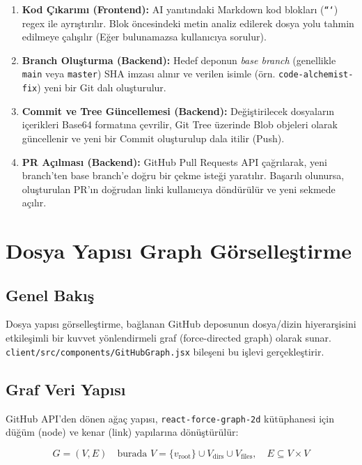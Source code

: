 \documentclass[12pt,a4paper]{article}
\begin{document}
\begin{enumerate}
    \item \textbf{Kod Çıkarımı (Frontend):} AI yanıtındaki Markdown kod blokları (\texttt{```}) regex ile ayrıştırılır. Blok öncesindeki metin analiz edilerek dosya yolu tahmin edilmeye çalışılır (Eğer bulunamazsa kullanıcıya sorulur).
    \item \textbf{Branch Oluşturma (Backend):} Hedef deponun \textit{base branch} (genellikle \texttt{main} veya \texttt{master}) SHA imzası alınır ve verilen isimle (örn. \texttt{code-alchemist-fix}) yeni bir Git dalı oluşturulur.
    \item \textbf{Commit ve Tree Güncellemesi (Backend):} Değiştirilecek dosyaların içerikleri Base64 formatına çevrilir, Git Tree üzerinde Blob objeleri olarak güncellenir ve yeni bir Commit oluşturulup dala itilir (Push).
    \item \textbf{PR Açılması (Backend):} GitHub Pull Requests API çağrılarak, yeni branch'ten base branch'e doğru bir çekme isteği yaratılır. Başarılı olunursa, oluşturulan PR'ın doğrudan linki kullanıcıya döndürülür ve yeni sekmede açılır.
\end{enumerate}

\section{Dosya Yapısı Graph Görselleştirme}
\label{sec:graph}

\subsection{Genel Bakış}

Dosya yapısı görselleştirme, bağlanan GitHub deposunun dosya/dizin hiyerarşisini etkileşimli bir kuvvet yönlendirmeli graf (force-directed graph) olarak sunar. \texttt{client/src/components/GitHubGraph.jsx} bileşeni bu işlevi gerçekleştirir.

\subsection{Graf Veri Yapısı}

GitHub API'den dönen ağaç yapısı, \texttt{react-force-graph-2d} kütüphanesi için düğüm (node) ve kenar (link) yapılarına dönüştürülür:

\begin{equation}
    G = (V, E) \quad \text{burada } V = \{v_{\text{root}}\} \cup V_{\text{dirs}} \cup V_{\text{files}}, \quad E \subseteq V \times V
\end{equation}
\end{document}
